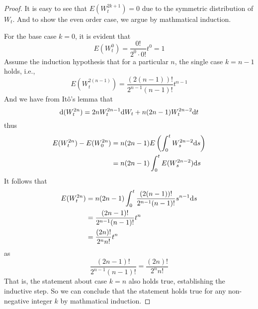 \documentclass{homework}
\begin{document}
    \problem
    \begin{proof}
        It is easy to see that $E(W_t^{2k+1})=0$ due to the symmetric distribution
        of $W_t$. And to show the even order case, we argue by mathmatical induction.

        For the base case $k=0$, it is evident that
        \[E(W_t^0)=\frac{0!}{2^0\cdot 0!}t^0=1\]
        Assume the induction hypothesis that for a particular $n$, the
        single case $k=n-1$ holds, i.e.,
        \[E(W_t^{2(n-1)})=\frac{(2(n-1))!}{2^{n-1}(n-1)!}t^{n-1}\]
        And we have from It\^o's lemma that
        \[\mathrm d (W_t^{2n})=2nW_t^{2n-1}\mathrm d W_t+n(2n-1)W_t^{2n-2}\mathrm d t\]
        thus
        \[\begin{aligned}
            E(W_t^{2n})-E(W_0^{2n})&=n(2n-1)E\left(\int_0^tW_s^{2n-2}\mathrm d s\right)\\
            &=n(2n-1)\int_0^tE(W_s^{2n-2})\mathrm d s
        \end{aligned}\]
        It follows that
        \[\begin{aligned}
            E(W_t^{2n})&=n(2n-1)\int_0^t\frac{(2(n-1))!}{2^{n-1}(n-1)!}s^{n-1}\mathrm d s\\
            &=\frac{(2n-1)!}{2^{n-1}(n-1)!}t^n\\
            &=\frac{(2n)!}{2^nn!}t^n
        \end{aligned}\]
        as
        \[\frac{(2n-1)!}{2^{n-1}(n-1)!}=\frac{(2n)!}{2^nn!}\]
        That is, the statement about case $k=n$ also holds true, establishing
        the inductive step.
        So we can conclude that the statement holds true for any non-negative integer $k$
        by mathmatical induction.

    \end{proof}
\end{document}
